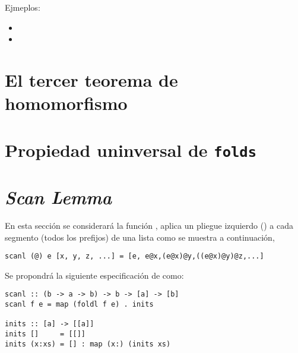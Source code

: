 Ejmeplos:
\begin{itemize}
    \item {}
    \item {}
\end{itemize}





\section{El tercer teorema de homomorfismo}
\cite{Gibbons96:Third}

\section{Propiedad uninversal de \texttt{folds}}
\cite{univ_expre_fold}

\section{\textit{Scan Lemma}}\label{fundamentos:scan_lemma}
En esta sección se considerará la función ,  aplica un pliegue
izquierdo () a cada segmento (todos los prefijos) de una lista como se muestra
a continuación,

\begin{verbatim}
scanl (@) e [x, y, z, ...] = [e, e@x,(e@x)@y,((e@x)@y)@z,...]
\end{verbatim}

Se propondrá la siguiente especificación de  como:
\begin{verbatim}
scanl :: (b -> a -> b) -> b -> [a] -> [b]
scanl f e = map (foldl f e) . inits

inits :: [a] -> [[a]]
inits []     = [[]]
inits (x:xs) = [] : map (x:) (inits xs)
\end{verbatim}

